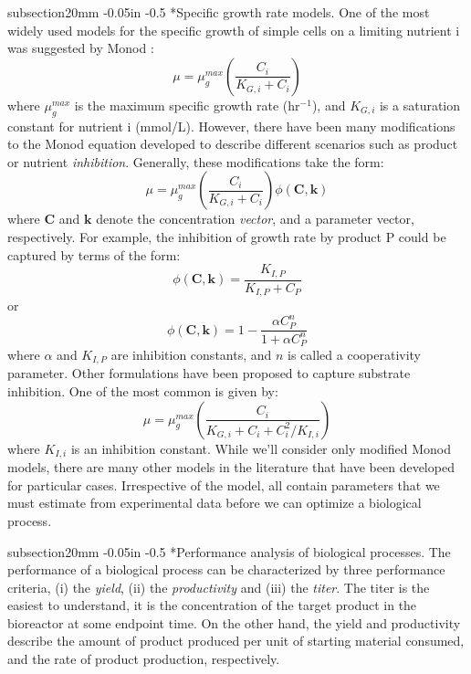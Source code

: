 \documentclass[11pt]{article}
\makeatletter
\theoremstyle{definition}
\renewcommand\subsection{\@startsection
	{subsection}{2}{0mm}
	{-0.05in}
	{-0.5\baselineskip}
	{\normalfont\normalsize\bfseries}}
\makeatother
\begin{document}
\subsection*{Specific growth rate models.}
One of the most widely used models for the specific growth of simple cells on a limiting nutrient i was suggested by Monod \citep{MONOD-1949}:
\begin{equation}\label{eqn:simple-monod-single-substrate}
\mu = \mu_{g}^{max}\left(\frac{C_{i}}{K_{G,i}+C_{i}}\right)
\end{equation}where $\mu^{max}_{g}$ is the maximum specific growth rate (hr$^{-1}$), and $K_{G,i}$ is a saturation constant for nutrient i (mmol/L).
However, there have been many modifications to the Monod equation developed to describe different scenarios
such as product or nutrient \textit{inhibition}. Generally, these modifications take the form:
\begin{equation}
\mu = \mu_{g}^{max}\left(\frac{C_{i}}{K_{G,i}+C_{i}}\right)\phi\left(\mathbf{C},\mathbf{k}\right)
\end{equation}where $\mathbf{C}$ and $\mathbf{k}$ denote the concentration \textit{vector}, and a parameter vector, respectively.
For example, the inhibition of growth rate by product P could be captured by terms of the form:
\begin{equation}
\phi\left(\mathbf{C},\mathbf{k}\right) = \frac{K_{I,P}}{K_{I,P}+C_{P}}
\end{equation}or
\begin{equation}
\phi\left(\mathbf{C},\mathbf{k}\right) = 1 - \frac{\alpha C_{P}^{n}}{1 + \alpha C_{P}^{n}}
\end{equation}where $\alpha$ and $K_{I,P}$ are inhibition constants, and $n$ is called a cooperativity parameter.
Other formulations have been proposed to capture substrate inhibition. One of the most common is given by:
\begin{equation}
\mu = \mu_{g}^{max}\left(\frac{C_{i}}{K_{G,i}+C_{i} + C_{i}^{2}/K_{I,i}}\right)
\end{equation}where $K_{I,i}$ is an inhibition constant. While we'll consider only modified Monod models, there are many other models in the literature
that have been developed for particular cases. Irrespective of the model, all contain parameters that we must estimate from experimental data before we
can optimize a biological process.

\subsection*{Performance analysis of biological processes.}
The performance of a biological process can be characterized by three performance criteria, (i) the \textit{yield}, (ii) the \textit{productivity} and (iii) the \textit{titer}.
The titer is the easiest to understand, it is the concentration of the target product in the bioreactor at some endpoint time.
On the other hand, the yield and productivity describe the amount of product produced per unit of starting material consumed, and the rate of product production, respectively.
\end{document}
